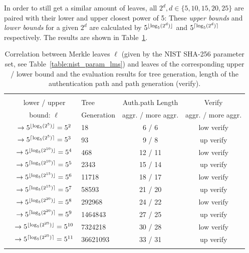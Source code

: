 In order to still get a similar amount of leaves, all $2^d, d \in \{5,10,15,20,25\}$ are paired with their lower and upper closest power of 5:
These \textit{upper bounds} and \textit{lower bounds} for a given $2^d$ are calculated by $5^{\lfloor\log_5(2^d)\rfloor}$ and $5^{\lceil\log_5(2^d)\rceil}$ respectively. The results are shown in Table~\ref{table:nist_upper_lower_bound}. 

\begin{table}
\centering
\begin{tabular}{r c l c c} 
 \hline\noalign{\smallskip}
 \multicolumn{5}{c}{\textbf{Merkle Tree - Lower / Upper Bound \extree}} \\
 \noalign{\smallskip} 
 & lower / upper  & Tree & Auth.path Length & Verify \\
 \noalign{\smallskip}
 & bound: $\ell$  & Generation & aggr. / more aggr. & aggr. / more aggr.\\
 \hline\noalign{\smallskip}
 \multirow{2}{*}{$2^5$} & $\rightarrow 5^{\lfloor\log_5(2^5)\rfloor} = 5^{2} $ & 18 & 6 / 6 & low verify \\
 & $\rightarrow 5^{\lceil\log_5(2^5)\rceil} = 5^{3}$ & 93 & 9 / 8 & up verify \\
 \hline\noalign{\smallskip} 
 \multirow{2}{*}{$2^{10}$} & $\rightarrow 5^{\lfloor\log_5(2^{10})\rfloor} = 5^{4}$ & 468 & 12 / 11 & low verify \\
 & $\rightarrow 5^{\lceil\log_5(2^{10})\rceil} = 5^{5}$ & 2343 & 15 / 14 & up verify \\
 \hline\noalign{\smallskip} 
 \multirow{2}{*}{$2^{15}$}& $\rightarrow 5^{\lfloor\log_5(2^{15})\rfloor} = 5^{6}$ & 11718 & 18 / 17 & low verify \\ 
 & $\rightarrow 5^{\lceil\log_5(2^{15})\rceil} = 5^{7}$ & 58593 & 21 / 20 & up verify \\ 
 \hline\noalign{\smallskip} 
 \multirow{2}{*}{$2^{20}$} & $\rightarrow 5^{\lfloor\log_5(2^{20})\rfloor} = 5^{8}$ & 292968 & 24 / 22 & low verify \\ 
 & $\rightarrow 5^{\lceil\log_5(2^{20})\rceil} = 5^{9}$ & 1464843 & 27 / 25 & up verify \\
 \hline\noalign{\smallskip}  
  \multirow{2}{*}{$2^{25}$} & $\rightarrow 5^{\lfloor\log_5(2^{25})\rfloor} =  5^{10}$ & 7324218 & 30 / 28 & low verify \\ 
 & $\rightarrow 5^{\lceil\log_5(2^{25})\rceil} = 5^{11}$ & 36621093 & 33 / 31 & up verify \\
 \hline\noalign{\smallskip}
 \end{tabular}
\caption{Correlation between Merkle leaves $\ell$ (given by the NIST SHA-256 parameter set, see Table~\ref{table:nist_param_lms}) and leaves of the corresponding upper / lower bound \extree and the evaluation results for tree generation, length of the authentication path and path generation (verify).}
\label{table:nist_upper_lower_bound}
\end{table}

